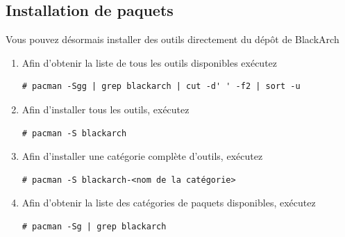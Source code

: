 \documentclass[a4paper, oneside, 11pt]{book}
\begin{document}
\subsection{Installation de paquets}
Vous pouvez désormais installer des outils directement du dépôt de BlackArch
\begin{enumerate}
\item Afin d'obtenir la liste de tous les outils disponibles exécutez
{\small
\color{gray}
\begin{verbatim}
# pacman -Sgg | grep blackarch | cut -d' ' -f2 | sort -u
\end{verbatim}
}
\item Afin d'installer tous les outils, exécutez
{\small
\color{gray}
\begin{verbatim}
# pacman -S blackarch
\end{verbatim}
}
\item Afin d'installer une catégorie complète d'outils, exécutez
{\small
\color{gray}
\begin{verbatim}
# pacman -S blackarch-<nom de la catégorie>
\end{verbatim}
}
\item Afin d'obtenir la liste des catégories de paquets disponibles, exécutez
{\small
\color{gray}
\begin{verbatim}
# pacman -Sg | grep blackarch
\end{verbatim}
}
\end{enumerate}
\end{document}

